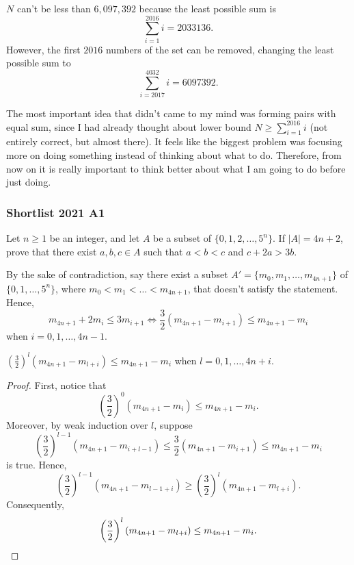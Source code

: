 $N$ can't be less than $6,097,392$ because the least possible sum is
\[
	\sum^{2016}_{i=1} i=2033136.
\]
However, the first $2016$ numbers of the set can be removed, changing the least
possible sum to
\[
	\sum^{4032}_{i=2017} i = 6097392.
\]

\begin{insight}
	The most important idea that didn't came to my mind was forming pairs with equal
	sum, since I had already thought about lower bound $N \ge \sum^{2016}_{i=1}i$
	(not entirely correct, but almost there). It feels like the biggest problem
	was focusing more on doing something instead of thinking about what to do.
	Therefore, from now on it is really important to think better about what I am
	going to do before just doing.
\end{insight}

\clearpage

\subsubsection{Shortlist 2021 A1}

\begin{problem}
Let $n \ge 1$ be an integer,
and let $A$ be a subset of $\{0,1,2,\dots,5^n\}$.
If $|A|=4n+2$, prove that there exist $a,b,c \in A$
such that $a < b < c$ and $c+2a > 3b$.
\end{problem}

By the sake of contradiction, say there exist a subset $A'=\{m_0,m_1,\dots,m_{4n+1}\}$ of $\{0,1,\dots,5^n\}$, where $m_0<m_1<\dots<m_{4n+1}$,
that doesn't satisfy the statement. Hence,
\[
	m_{4n+1}+2m_i \le 3m_{i+1} \iff \frac{3}{2}(m_{4n+1}-m_{i+1}) \le m_{4n+1}-m_i
\]
when $i=0,1,\dots,4n-1$.
\begin{claim}
	$\displaystyle \left(\frac{3}{2}\right)^l (m_{4n+1}-m_{l+i}) \le m_{4n+1}-m_i$ when $l=0,1,\dots, 4n+i$.
\end{claim}
\begin{proof}
	First, notice that
	\[
		\left(\frac{3}{2}\right)^0 (m_{4n+1}-m_i) \le m_{4n+1}-m_i.
	\]
	Moreover, by weak induction over $l$, suppose
	\[
		\left(\frac{3}{2}\right)^{l-1} (m_{4n+1}-m_{i+l-1}) \le \frac{3}{2}(m_{4n+1}-m_{i+1}) \le m_{4n+1}-m_i
	\]
	is true. Hence,
	\[
		\left(\frac{3}{2}\right)^{l-1} (m_{4n+1}-m_{l-1+i}) \ge \left(\frac{3}{2}\right)^l (m_{4n+1}-m_{l+i}).
	\]
	Consequently,
	\[
		\left(\frac{3}{2}\right)^l (m_{4n+1}-m_{l+i}) \le m_{4n+1}-m_i. \qedhere
	\]
\end{proof}

